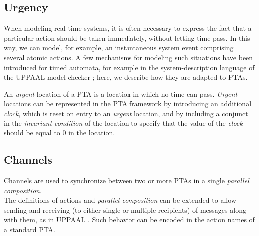 \subsection{Urgency}
When modeling real-time systems, it is often necessary to express the fact that a particular action should be taken immediately, without letting time pass. In this way, we can model, for example, an instantaneous system event comprising several atomic actions. A few mechanisms for modeling such situations have been introduced for timed automata, for example in the system-description language of the UPPAAL model checker \cite{behrmann2006uppaal}; here, we describe how they are adapted to PTAs. 
\par An \textit{urgent} location of a PTA is a location in which no time can pass. \textit{Urgent} locations can be represented in the PTA framework by introducing an additional \textit{clock}, which is reset on entry to an \textit{urgent} location, and by including a conjunct in the \textit{\textit{invariant condition}} of the location to specify that the value of the \textit{clock} should be equal to 0 in the location.\\
\subsection{Channels}
Channels are used to synchronize between two or more PTAs in a single \textit{parallel composition}. \\
The definitions of actions and \textit{parallel composition} can be extended to allow sending and receiving (to either single or multiple recipients) of messages along with them, as in UPPAAL \cite{behrmann2006uppaal}. Such behavior can be encoded in the action names of a standard PTA.\\
